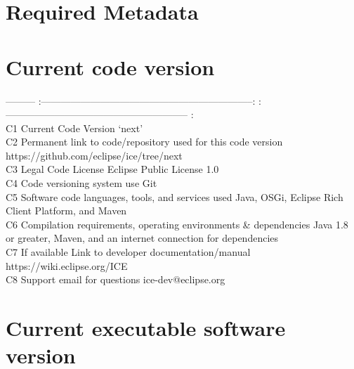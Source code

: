 \section*{Required Metadata}\label{required-metadata}

\section*{Current code version}\label{current-code-version}

--------- \textbar{}
:-----------------------------------------------------------------:
\textbar{} :-------------------------------------------------------- :
\textbar{}\\C1 \textbar{} Current Code Version \textbar{} `next'
\textbar{}\\C2 \textbar{} Permanent link to code/repository used for
this code version \textbar{} https://github.com/eclipse/ice/tree/next
\textbar{}\\C3 \textbar{} Legal Code License \textbar{} Eclipse Public
License 1.0 \textbar{}\\C4 \textbar{} Code versioning system use
\textbar{} Git \textbar{}\\C5 \textbar{} Software code languages, tools,
and services used \textbar{} Java, OSGi, Eclipse Rich Client Platform,
and Maven \textbar{}\\C6 \textbar{} Compilation requirements, operating
environments \& dependencies \textbar{} Java 1.8 or greater, Maven, and
an internet connection for dependencies \textbar{}\\C7 \textbar{} If
available Link to developer documentation/manual \textbar{}
https://wiki.eclipse.org/ICE \textbar{}\\C8 \textbar{} Support email for
questions \textbar{} ice-dev@eclipse.org \textbar{}

\section*{Current executable software
version}\label{current-executable-software-version}

